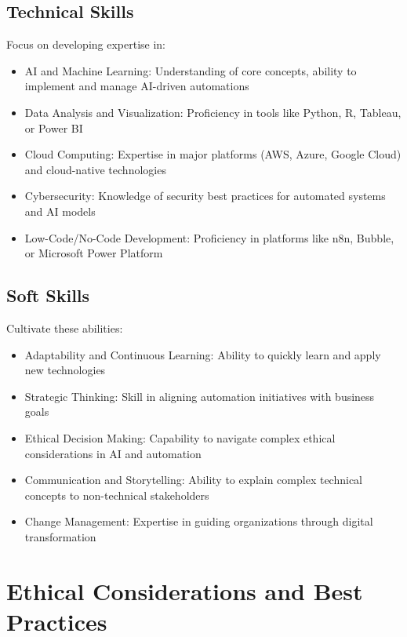 \subsection{Technical Skills}

Focus on developing expertise in:

\begin{itemize}
    \item AI and Machine Learning: Understanding of core concepts, ability to implement and manage AI-driven automations
    \item Data Analysis and Visualization: Proficiency in tools like Python, R, Tableau, or Power BI
    \item Cloud Computing: Expertise in major platforms (AWS, Azure, Google Cloud) and cloud-native technologies
    \item Cybersecurity: Knowledge of security best practices for automated systems and AI models
    \item Low-Code/No-Code Development: Proficiency in platforms like n8n, Bubble, or Microsoft Power Platform
\end{itemize}

\subsection{Soft Skills}

Cultivate these abilities:

\begin{itemize}
    \item Adaptability and Continuous Learning: Ability to quickly learn and apply new technologies
    \item Strategic Thinking: Skill in aligning automation initiatives with business goals
    \item Ethical Decision Making: Capability to navigate complex ethical considerations in AI and automation
    \item Communication and Storytelling: Ability to explain complex technical concepts to non-technical stakeholders
    \item Change Management: Expertise in guiding organizations through digital transformation
\end{itemize}


\section{Ethical Considerations and Best Practices}

